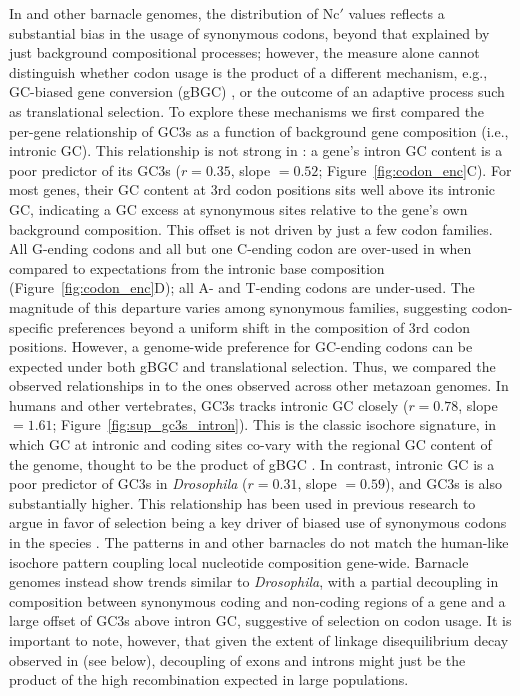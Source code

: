 In \bgla{} and other barnacle genomes, the distribution of Nc$'$ values reflects a substantial bias in
the usage of synonymous codons, beyond that explained by just background compositional processes;
however, the measure alone cannot distinguish whether codon usage is the product of a different
mechanism, e.g., GC-biased gene conversion (gBGC) , or the outcome of
an adaptive process such as translational selection.
To explore these mechanisms we first compared the per-gene relationship of GC3s as a function of
background gene composition (i.e., intronic GC).
This relationship is not strong in \bgla{}: a gene's intron GC content is a poor predictor of its
GC3s ($r=0.35$, slope $=0.52$; Figure~\ref{fig:codon_enc}C).
For most genes, their GC content at 3rd codon positions sits well above its intronic GC,
indicating a GC excess at synonymous sites relative to the gene's own background composition.
This offset is not driven by just a few codon families.
All G-ending codons and all but one C-ending codon are over-used in \bgla{} when compared to
expectations from the intronic base composition (Figure~\ref{fig:codon_enc}D); all A- and T-ending
codons are under-used.
The magnitude of this departure varies among synonymous families, suggesting codon-specific
preferences beyond a uniform shift in the composition of 3rd codon positions.
However, a genome-wide preference for GC-ending codons can be expected under both gBGC and
translational selection.
Thus, we compared the observed relationships in \bgla{} to the ones observed across other
metazoan genomes.
In humans and other vertebrates, GC3s tracks intronic GC closely ($r=0.78$, slope $=1.61$;
Figure~\ref{fig:sup_gc3s_intron}).
This is the classic isochore signature, in which GC at intronic and coding sites co-vary with the
regional GC content of the genome, thought to be the product of gBGC \citep{aissani_1991_isochores,duret_2009_gbgc}.
In contrast, intronic GC is a poor predictor of GC3s in \textit{Drosophila} ($r=0.31$,
slope $=0.59$), and GC3s is also substantially higher.
This relationship has been used in previous research to argue in favor of selection being a
key driver of biased use of synonymous codons in the species \citep{moriyama_1993_codon,kliman_1994_codon}.
The patterns in \bgla{} and other barnacles do not match the human-like isochore pattern coupling
local nucleotide composition gene-wide.
Barnacle genomes instead show trends similar to \textit{Drosophila}, with a partial
decoupling in composition between synonymous coding and non-coding regions of a gene and a large offset of GC3s above intron GC,
suggestive of selection on codon usage.
It is important to note, however, that given the extent of linkage disequilibrium decay
observed in \bgla{} (see below), decoupling of exons and introns might just be the product
of the high recombination expected in large \Ne{} populations.
\vspace{0.1cm}


